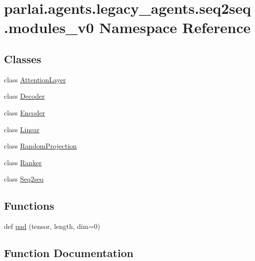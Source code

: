 \hypertarget{namespaceparlai_1_1agents_1_1legacy__agents_1_1seq2seq_1_1modules__v0}{}\section{parlai.\+agents.\+legacy\+\_\+agents.\+seq2seq.\+modules\+\_\+v0 Namespace Reference}
\label{namespaceparlai_1_1agents_1_1legacy__agents_1_1seq2seq_1_1modules__v0}
\subsection*{Classes}
\begin{DoxyCompactItemize}
\item 
class \hyperlink{classparlai_1_1agents_1_1legacy__agents_1_1seq2seq_1_1modules__v0_1_1AttentionLayer}{Attention\+Layer}
\item 
class \hyperlink{classparlai_1_1agents_1_1legacy__agents_1_1seq2seq_1_1modules__v0_1_1Decoder}{Decoder}
\item 
class \hyperlink{classparlai_1_1agents_1_1legacy__agents_1_1seq2seq_1_1modules__v0_1_1Encoder}{Encoder}
\item 
class \hyperlink{classparlai_1_1agents_1_1legacy__agents_1_1seq2seq_1_1modules__v0_1_1Linear}{Linear}
\item 
class \hyperlink{classparlai_1_1agents_1_1legacy__agents_1_1seq2seq_1_1modules__v0_1_1RandomProjection}{Random\+Projection}
\item 
class \hyperlink{classparlai_1_1agents_1_1legacy__agents_1_1seq2seq_1_1modules__v0_1_1Ranker}{Ranker}
\item 
class \hyperlink{classparlai_1_1agents_1_1legacy__agents_1_1seq2seq_1_1modules__v0_1_1Seq2seq}{Seq2seq}
\end{DoxyCompactItemize}
\subsection*{Functions}
\begin{DoxyCompactItemize}
\item 
def \hyperlink{namespaceparlai_1_1agents_1_1legacy__agents_1_1seq2seq_1_1modules__v0_afab760d03d96d6a368953b7173ea189a}{pad} (tensor, length, dim=0)
\end{DoxyCompactItemize}


\subsection{Function Documentation}
\mbox{\label{namespaceparlai_1_1agents_1_1legacy__agents_1_1seq2seq_1_1modules__v0_afab760d03d96d6a368953b7173ea189a}} 
